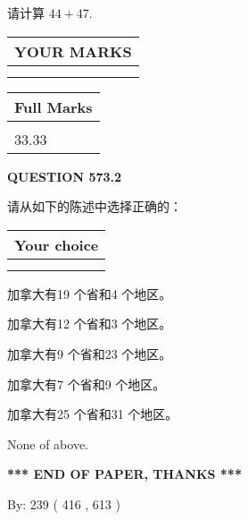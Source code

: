 \documentclass{ctexart}
\begin{document}
  
 
请计算 $ %
44 +  %
47 $.
 

 

 
  
\vspace{0.2in}
  
\noindent\begin{tabular}{|l|}
\hline
 YOUR MARKS  \\
\hline
 \\ 
 \\ 
\hline
\end{tabular}
\hspace{0.05in} \begin{tabular}{|l|}
\hline
 Full Marks  \\
\hline
 \\ 
33.33 \\
\hline
\end{tabular}
{\textbf{\Large{QUESTION
573.2 
}}}
  
  
请从如下的陈述中选择正确的：
  
  
\noindent\hspace{3.0in} \begin{tabular}{|l|}
\hline
Your choice \\
\hline
 \\ 
 \\ 
\hline
\end{tabular}
  
  
 
 
加拿大有19 个省和4 个地区。
 
 
加拿大有12 个省和3 个地区。
 
 
加拿大有9 个省和23 个地区。
 
 
加拿大有7 个省和9 个地区。
 
 
加拿大有25 个省和31 个地区。
 
 
 None of above.
 
 
   
   
 \vspace{0.2in}
 
   
   
   
   
\vspace{1.0in} 
{\textbf{\large{ *** END OF PAPER, THANKS *** }}} 
   
   
\hspace{1.0in} By: 
 239 ( 416 ,  613 )
   
\end{document}
